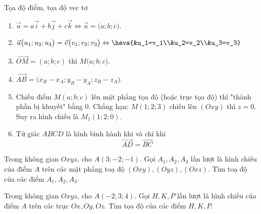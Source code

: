 \begin{dang}{Tọa độ điểm, tọa độ vec tơ}
	\begin{enumerate}
		\item $\vec{u}=a\vec{i}+b\vec{j}+c\vec{k} \Leftrightarrow \vec{u}=\big(a;b;c\big)$.
		\item $\vec{u}\big(u_1;u_2;u_3\big)=\vec{v}\big(v_1;v_2;v_3\big) \Leftrightarrow \heva{&u_1=v_1\\&u_2=v_2\\&u_3=v_3}$
		\item $\vec{OM}=(a;b;c)$ thì $M\big(a;b;c\big)$.
		\item $\vec{AB}=\big(x_B-x_A;y_B-y_A;z_B-z_A \big).$
		\item Chiếu điểm $M(a;b;c)$ lên mặt phẳng tọa độ (hoặc trục tọa độ) thì "thành phần bị khuyết" bằng $0$. Chẳng hạn: $M(1;2;3)$ chiếu lên $(Oxy)$ thì $z=0$. Suy ra hình chiếu là $M_1(1;2;0)$.
		\item Tứ giác $ABCD$ là hình bình hành khi và chỉ khi $$\vec{AD}=\vec{BC}$$
	\end{enumerate}
\end{dang}
\BTTL
\begin{vd}
	Trong không gian $Oxyz$, cho $A(3 ;-2 ;-1)$. Gọi $ A_1, A_2, A_3$ lần lượt là hình chiếu của điểm $A$ trên các mặt phẳng toạ độ $(Oxy),(Oyz),(Oxz)$. Tìm toạ độ của các điểm $ A_1, A_2, A_3$.
\end{vd}
\begin{vd}
	Trong không gian $Oxyz$, cho $A(-2;3;4)$. Gọi $H, K, P$ lần lượt là hình chiếu của điểm $A$ trên các trục $Ox, Oy, Oz$. Tìm tọa độ của các điểm $H,K,P$.
\end{vd}
